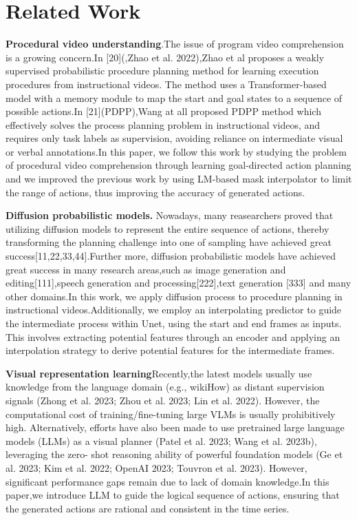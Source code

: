 \documentclass{article} %
\begin{document}
\section{Related Work}
\label{gen_inst}
\textbf{Procedural video understanding}.The issue of program video comprehension is a growing concern.In [20](,Zhao et al. 2022),Zhao et al proposes a weakly supervised probabilistic procedure planning method for learning execution procedures from instructional videos. The method uses a Transformer-based model with a memory module to map the start and goal states to a sequence of possible actions.In [21](PDPP),Wang at all proposed PDPP method which effectively solves the process planning problem in instructional videos, and requires only task labels as supervision, avoiding reliance on intermediate visual or verbal annotations.In this paper, we follow this work by studying the problem of procedural video comprehension through learning goal-directed action planning and we improved the previous work by using LM-based mask interpolator to limit the
range of actions, thus improving the accuracy of generated actions.

\textbf{Diffusion probabilistic models.}
Nowadays, many reasearchers proved that utilizing diffusion models to represent the entire sequence of actions, thereby transforming the planning challenge into one of sampling have achieved great success[11,22,33,44].Further more,
diffusion probabilistic models have achieved great success in many research areas,such as image generation and editing[111],speech generation and processing[222],text generation [333] and many other domains.In this work, we apply diffusion process to procedure planning in instructional videos.Additionally, we employ an interpolating predictor to guide the intermediate process within Unet, using the start and end frames as inputs. This involves extracting potential features through an encoder and applying an interpolation strategy to derive potential features for the intermediate frames.

\textbf{Visual representation learning}Recently,the latest models usually use knowledge from the language domain (e.g., wikiHow) as distant supervision signals (Zhong et al. 2023; Zhou et al. 2023; Lin et al. 2022). However, the computational cost of training/fine-tuning large VLMs is usually prohibitively high. Alternatively, efforts have also been made to use pretrained large language models (LLMs) as a visual planner (Patel et al. 2023; Wang et al. 2023b), leveraging the zero- shot reasoning ability of powerful foundation models (Ge et al. 2023; Kim et al. 2022; OpenAI 2023; Touvron et al. 2023). However, significant performance gaps remain due to lack of domain knowledge.In this paper,we introduce LLM to guide the logical sequence of actions, ensuring that the generated actions are rational and consistent in the time series.
\end{document}
